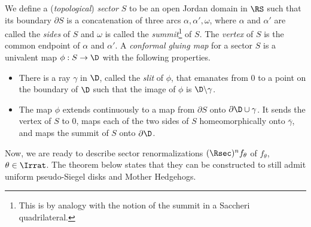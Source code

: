 \documentclass{amsart}
\begin{document}
\begin{definition}
\label{def:sector}
    We define a (\emph{topological}) \emph{sector} $S$ to be an open Jordan domain in $\RS$ such that its boundary $\partial S$ is a concatenation of three arcs $\alpha, \alpha', \omega$, where $\alpha$ and $\alpha'$ are called the \emph{sides} of $S$ and $\omega$ is called the \emph{summit}\footnote{This is by analogy with the notion of the summit in a Saccheri quadrilateral.} of $S$. The \emph{vertex} of $S$ is the common endpoint of $\alpha$ and $\alpha'$.
    A \emph{conformal gluing map} for a sector $S$ is a univalent map $\phi: S \to \D$ with the following properties.
    \begin{itemize}
        \item There is a ray $\gamma$ in $\D$, called the \emph{slit} of $\phi$, that emanates from $0$ to a point on the boundary of $\D$ such that the image of $\phi$ is $\D \backslash \gamma$.
        \item The map $\phi$ extends continuously to a map from $\partial S$ onto $\partial \D \cup \gamma$. It sends the vertex of $S$ to $0$, maps each of the two sides of $S$ homeomorphically onto $\overline{\gamma}$, and maps the summit of $S$ onto $\partial \D$.
    \end{itemize}
\end{definition} 

Now, we are ready to describe sector renormalizations $(\Rsec)^n f_\theta$ of $f_\theta$, $\theta \in \Irrat$.
The theorem below states that they can be constructed to still admit uniform pseudo-Siegel disks and Mother Hedgehogs.
\end{document}
